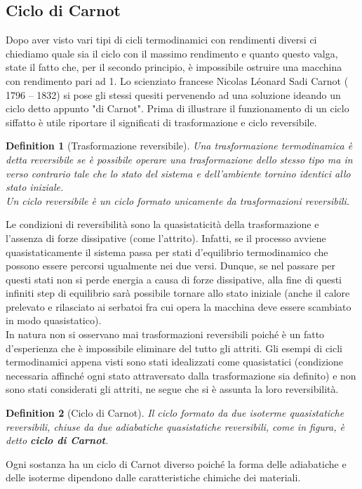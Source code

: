 \documentclass[10pt,a4paper]{article}
\newtheorem{definition}{Definition}
\begin{document}
\subsection{Ciclo di Carnot}
Dopo aver visto vari tipi di cicli termodinamici con rendimenti diversi ci chiediamo quale sia il ciclo con il massimo rendimento e quanto questo valga, state il fatto che, per il secondo principio, è impossibile ostruire una macchina con rendimento pari ad 1. Lo scienziato francese Nicolas Léonard Sadi Carnot ( 1796 – 1832) si pose gli stessi quesiti pervenendo ad una soluzione ideando un ciclo detto appunto "di Carnot". Prima di illustrare il funzionamento di un ciclo siffatto è utile riportare il significati di trasformazione e ciclo reversibile.
\begin{definition}[Trasformazione reversibile]
	Una trasformazione termodinamica è detta reversibile se è possibile operare una trasformazione dello stesso tipo ma in verso contrario tale che lo stato del sistema e dell'ambiente tornino identici allo stato iniziale. \\
	Un ciclo reversibile è un ciclo formato unicamente da trasformazioni reversibili.
\end{definition}
Le condizioni di reversibilità sono la quasistaticità della trasformazione e l'assenza di forze dissipative (come l'attrito). Infatti, se il processo avviene quasistaticamente il sistema passa per stati d'equilibrio termodinamico che possono essere percorsi ugualmente nei due versi. Dunque, se nel passare per questi stati non si perde energia a causa di forze dissipative, alla fine di questi infiniti step di equilibrio sarà possibile tornare allo stato iniziale (anche il calore prelevato e rilasciato ai serbatoi fra cui opera la macchina deve essere scambiato in modo quasistatico).\\
In natura non si osservano mai trasformazioni reversibili poiché è un fatto d'esperienza che è impossibile eliminare del tutto gli attriti.  Gli esempi di cicli termodinamici appena visti sono stati idealizzati come quasistatici (condizione necessaria affinché ogni stato attraversato dalla trasformazione sia definito) e non sono stati considerati gli attriti, ne segue che si è assunta la loro reversibilità. 
\begin{definition}[Ciclo di Carnot]
	Il ciclo formato da due isoterme quasistatiche reversibili, chiuse da due adiabatiche quasistatiche reversibili, come in figura, è detto \textbf{ciclo di Carnot}.
\end{definition} 
 Ogni sostanza ha un ciclo di Carnot diverso poiché la forma delle adiabatiche e delle isoterme dipendono dalle caratteristiche chimiche dei materiali. 
\end{document}
